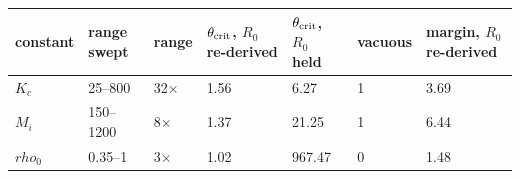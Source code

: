 \begin{tabular}{@{}lllllll@{}}
\toprule
\textbf{constant} & \textbf{range swept} & \textbf{range} & \textbf{$\theta_{\mathrm{crit}}$, $R_0$ re-derived} & \textbf{$\theta_{\mathrm{crit}}$, $R_0$ held} & \textbf{vacuous} & \textbf{margin, $R_0$ re-derived} \\
\midrule
$K_c$ & 25--800 & 32$\times$ & 1.56 & 6.27 & 1 & 3.69 \\
$M_{i}$ & 150--1200 & 8$\times$ & 1.37 & 21.25 & 1 & 6.44 \\
$rho_{0}$ & 0.35--1 & 3$\times$ & 1.02 & 967.47 & 0 & 1.48 \\
\bottomrule
\end{tabular}
